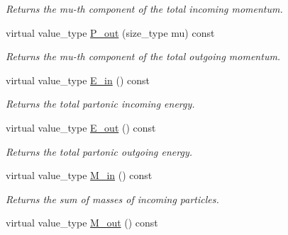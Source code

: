 \begin{DoxyCompactItemize}
\begin{DoxyCompactList}\small\item\em Returns the mu-\/th component of the total incoming momentum. \end{DoxyCompactList}\item 
\hypertarget{a00442_afadc3f65e1c562102d5067e570c7fda9}{virtual value\-\_\-type \hyperlink{a00442_afadc3f65e1c562102d5067e570c7fda9}{P\-\_\-out} (size\-\_\-type mu) const }\label{a00442_afadc3f65e1c562102d5067e570c7fda9}

\begin{DoxyCompactList}\small\item\em Returns the mu-\/th component of the total outgoing momentum. \end{DoxyCompactList}\item 
\hypertarget{a00442_a9930f8e4048c4e777ecf488c76bd7e25}{virtual value\-\_\-type \hyperlink{a00442_a9930f8e4048c4e777ecf488c76bd7e25}{E\-\_\-in} () const }\label{a00442_a9930f8e4048c4e777ecf488c76bd7e25}

\begin{DoxyCompactList}\small\item\em Returns the total partonic incoming energy. \end{DoxyCompactList}\item 
\hypertarget{a00442_a1294d82ea42d2f0123c126c61dc5589d}{virtual value\-\_\-type \hyperlink{a00442_a1294d82ea42d2f0123c126c61dc5589d}{E\-\_\-out} () const }\label{a00442_a1294d82ea42d2f0123c126c61dc5589d}

\begin{DoxyCompactList}\small\item\em Returns the total partonic outgoing energy. \end{DoxyCompactList}\item 
\hypertarget{a00442_a701fd5ce697720bf36528902446b048f}{virtual value\-\_\-type \hyperlink{a00442_a701fd5ce697720bf36528902446b048f}{M\-\_\-in} () const }\label{a00442_a701fd5ce697720bf36528902446b048f}

\begin{DoxyCompactList}\small\item\em Returns the sum of masses of incoming particles. \end{DoxyCompactList}\item 
\hypertarget{a00442_ac22c85f2216760d8b616bb2b36578b14}{virtual value\-\_\-type \hyperlink{a00442_ac22c85f2216760d8b616bb2b36578b14}{M\-\_\-out} () const }\label{a00442_ac22c85f2216760d8b616bb2b36578b14}


\end{DoxyCompactItemize}
